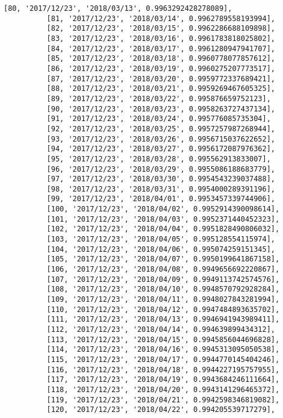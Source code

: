 \documentclass[11pt]{article}
\begin{document}
\begin{Verbatim}[commandchars=\\\{\}]
          [80, '2017/12/23', '2018/03/13', 0.9963292428278089],
          [81, '2017/12/23', '2018/03/14', 0.9962789558193994],
          [82, '2017/12/23', '2018/03/15', 0.9962286688109898],
          [83, '2017/12/23', '2018/03/16', 0.9961783818025802],
          [84, '2017/12/23', '2018/03/17', 0.9961280947941707],
          [85, '2017/12/23', '2018/03/18', 0.9960778077857612],
          [86, '2017/12/23', '2018/03/19', 0.9960275207773517],
          [87, '2017/12/23', '2018/03/20', 0.9959772337689421],
          [88, '2017/12/23', '2018/03/21', 0.9959269467605325],
          [89, '2017/12/23', '2018/03/22', 0.995876659752123],
          [90, '2017/12/23', '2018/03/23', 0.9958263727437134],
          [91, '2017/12/23', '2018/03/24', 0.995776085735304],
          [92, '2017/12/23', '2018/03/25', 0.9957257987268944],
          [93, '2017/12/23', '2018/03/26', 0.9956715037622652],
          [94, '2017/12/23', '2018/03/27', 0.9956172087976362],
          [95, '2017/12/23', '2018/03/28', 0.995562913833007],
          [96, '2017/12/23', '2018/03/29', 0.9955086188683779],
          [97, '2017/12/23', '2018/03/30', 0.9954543239037488],
          [98, '2017/12/23', '2018/03/31', 0.9954000289391196],
          [99, '2017/12/23', '2018/04/01', 0.9953457339744906],
          [100, '2017/12/23', '2018/04/02', 0.9952914390098614],
          [101, '2017/12/23', '2018/04/03', 0.9952371440452323],
          [102, '2017/12/23', '2018/04/04', 0.9951828490806032],
          [103, '2017/12/23', '2018/04/05', 0.995128554115974],
          [104, '2017/12/23', '2018/04/06', 0.995074259151345],
          [105, '2017/12/23', '2018/04/07', 0.9950199641867158],
          [106, '2017/12/23', '2018/04/08', 0.9949656692220867],
          [107, '2017/12/23', '2018/04/09', 0.9949113742574576],
          [108, '2017/12/23', '2018/04/10', 0.9948570792928284],
          [109, '2017/12/23', '2018/04/11', 0.9948027843281994],
          [110, '2017/12/23', '2018/04/12', 0.9947484893635702],
          [111, '2017/12/23', '2018/04/13', 0.9946941943989411],
          [112, '2017/12/23', '2018/04/14', 0.994639899434312],
          [113, '2017/12/23', '2018/04/15', 0.9945856044696828],
          [114, '2017/12/23', '2018/04/16', 0.9945313095050538],
          [115, '2017/12/23', '2018/04/17', 0.9944770145404246],
          [116, '2017/12/23', '2018/04/18', 0.9944227195757955],
          [117, '2017/12/23', '2018/04/19', 0.9943684246111664],
          [118, '2017/12/23', '2018/04/20', 0.9943141296465372],
          [119, '2017/12/23', '2018/04/21', 0.9942598346819082],
          [120, '2017/12/23', '2018/04/22', 0.994205539717279],

\end{Verbatim}
\end{document}

